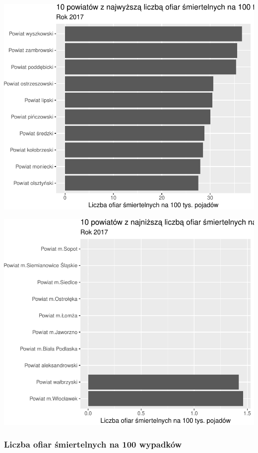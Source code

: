 \documentclass[
]{article}
\begin{document}
\begin{flushleft}\includegraphics{raport_wypadki_files/figure-latex/unnamed-chunk-42-1} \end{flushleft}

\begin{flushleft}\includegraphics{raport_wypadki_files/figure-latex/unnamed-chunk-43-1} \end{flushleft}

\hypertarget{liczba-ofiar-ux15bmiertelnych-na-100-wypadkuxf3w}{%
\subsubsection{Liczba ofiar śmiertelnych na 100
wypadków}\label{liczba-ofiar-ux15bmiertelnych-na-100-wypadkuxf3w}}
\end{document}
